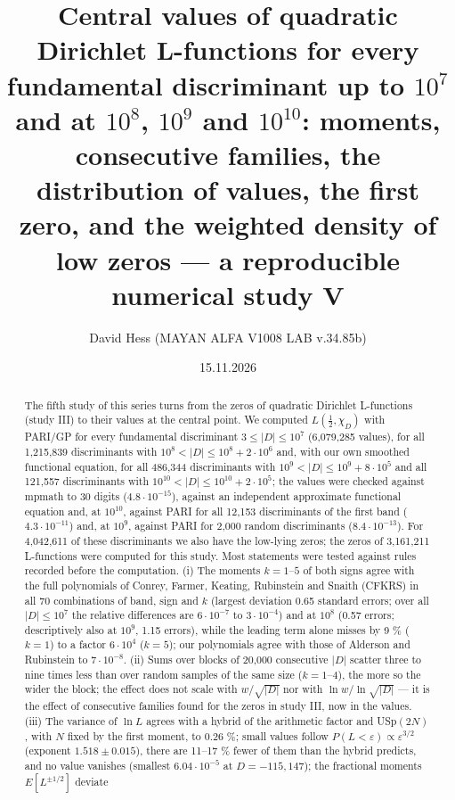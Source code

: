 \documentclass[
  10pt,
]{article}
\title{Central values of quadratic Dirichlet L-functions for every
fundamental discriminant up to \(10^7\) and at \(10^8\), \(10^9\) and
\(10^{10}\): moments, consecutive families, the distribution of values,
the first zero, and the weighted density of low zeros --- a reproducible
numerical study V}
\author{David Hess (MAYAN ALFA V1008 LAB v.34.85b)}
\date{15.11.2026}
\begin{document}
\maketitle
\begin{abstract}
The fifth study of this series turns from the zeros of quadratic
Dirichlet L-functions (study III) to their values at the central point.
We computed \(L(\tfrac12, \chi_D)\) with PARI/GP for every fundamental
discriminant \(3 \le |D| \le 10^7\) (6,079,285 values), for all
1,215,839 discriminants with \(10^8 < |D| \le 10^8 + 2\cdot10^6\) and,
with our own smoothed functional equation, for all 486,344 discriminants
with \(10^9 < |D| \le 10^9 + 8\cdot10^5\) and all 121,557 discriminants
with \(10^{10} < |D| \le 10^{10} + 2\cdot10^5\); the values were checked
against mpmath to 30 digits (\(4.8\cdot10^{-15}\)), against an
independent approximate functional equation and, at \(10^{10}\), against
PARI for all 12,153 discriminants of the first band
(\(4.3\cdot10^{-11}\)) and, at \(10^9\), against PARI for 2,000 random
discriminants (\(8.4\cdot10^{-13}\)). For 4,042,611 of these
discriminants we also have the low-lying zeros; the zeros of 3,161,211
L-functions were computed for this study. Most statements were tested
against rules recorded before the computation. (i) The moments
\(k = 1\)--\(5\) of both signs agree with the full polynomials of
Conrey, Farmer, Keating, Rubinstein and Snaith (CFKRS) in all 70
combinations of band, sign and \(k\) (largest deviation 0.65 standard
errors; over all \(|D| \le 10^7\) the relative differences are
\(6\cdot10^{-7}\) to \(3\cdot10^{-4}\)) and at \(10^8\) (0.57 errors;
descriptively also at \(10^9\), 1.15 errors), while the leading term
alone misses by 9 \% (\(k = 1\)) to a factor \(6\cdot10^4\) (\(k = 5\));
our polynomials agree with those of Alderson and Rubinstein to
\(7\cdot10^{-8}\). (ii) Sums over blocks of 20,000 consecutive \(|D|\)
scatter three to nine times less than over random samples of the same
size (\(k = 1\)--4), the more so the wider the block; the effect does
not scale with \(w/\sqrt{|D|}\) nor with \(\ln w/\ln\sqrt{|D|}\) --- it
is the effect of consecutive families found for the zeros in study III,
now in the values. (iii) The variance of \(\ln L\) agrees with a hybrid
of the arithmetic factor and USp\((2N)\), with \(N\) fixed by the first
moment, to 0.26 \%; small values follow
\(P(L < \varepsilon) \propto \varepsilon^{3/2}\) (exponent
\(1.518 \pm 0.015\)), there are 11--17 \% fewer of them than the hybrid
predicts, and no value vanishes (smallest \(6.04\cdot10^{-5}\) at
\(D = -115{,}147\)); the fractional moments \(E[L^{\pm 1/2}]\) deviate

\end{abstract}
\end{document}
